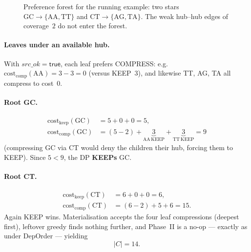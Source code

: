 \documentclass[11pt,a4paper]{article}
\begin{document}
\begin{figure}[ht]
\centering
{}
\caption{Preference forest for the running example: two stars
\(\mathrm{GC}\to\{\mathrm{AA},\mathrm{TT}\}\) and
\(\mathrm{CT}\to\{\mathrm{AG},\mathrm{TA}\}\). The weak hub--hub
edges of coverage~$2$ do not enter the forest.}
\label{fig:pref-forest}
\end{figure}

\paragraph{Leaves under an available hub.}
With \(\mathit{src\_ok}=\mathsf{true}\), each leaf prefers COMPRESS:
e.g.\ \(\mathrm{cost}_{\mathrm{comp}}(\mathrm{AA})=3-3=0\)
(versus KEEP~$3$), and likewise TT, AG, TA all compress to cost~$0$.

\paragraph{Root GC.}
\[
\begin{aligned}
\mathrm{cost}_{\mathrm{keep}}(\mathrm{GC})
  &= 5 + 0 + 0 = 5,\\
\mathrm{cost}_{\mathrm{comp}}(\mathrm{GC})
  &= (5-2) + \underbrace{3}_{\mathrm{AA\,KEEP}}
           + \underbrace{3}_{\mathrm{TT\,KEEP}} = 9
\end{aligned}
\]
(compressing GC via CT would deny the children their hub, forcing
them to KEEP). Since \(5<9\), the DP \textbf{KEEPs} GC.

\paragraph{Root CT.}
\[
\begin{aligned}
\mathrm{cost}_{\mathrm{keep}}(\mathrm{CT})
  &= 6 + 0 + 0 = 6,\\
\mathrm{cost}_{\mathrm{comp}}(\mathrm{CT})
  &= (6-2) + 5 + 6 = 15.
\end{aligned}
\]
Again KEEP wins. Materialisation accepts the four leaf compressions
(deepest first), leftover greedy finds nothing further, and Phase~II
is a no-op --- exactly as under DepOrder --- yielding
\[
|C|=14.
\]
\end{document}
